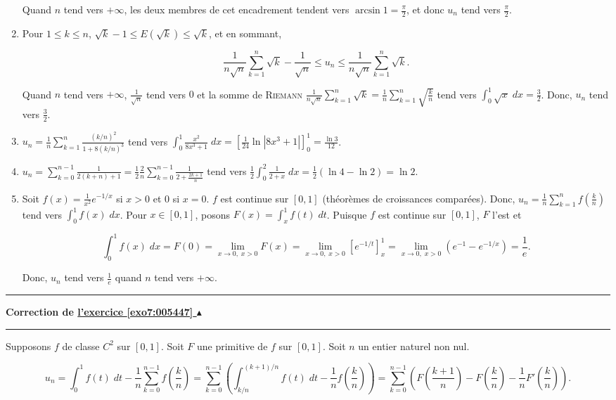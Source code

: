 \documentclass[11pt,a4paper]{article}
\newcommand{\Arcsin}{\mathop{\mathrm{arcsin}}\nolimits}
\newcounter{exo}
\newcommand{\correction}[1]{\hypertarget{cor7:#1}{}\label{cor7:#1}{\bf Correction de \hyperlink{exo7:#1}{l'exercice \ref{exo7:#1} $\blacktriangle$}}\vspace{1mm}\hrule\vspace{1mm}}
\newcommand{\fincorrection}{\vspace{1mm}\hrule\vspace*{7mm}}
\begin{document}
\begin{enumerate}
Quand $n$ tend vers $+\infty$, les deux membres de cet encadrement tendent vers $\Arcsin1=\frac{\pi}{2}$, et donc $u_n$ tend vers $\frac{\pi}{2}$.

\item  Pour $1\leq k\leq n$, $\sqrt{k}-1\leq E(\sqrt{k})\leq \sqrt{k}$, et en sommant,

$$\frac{1}{n\sqrt{n}}\sum_{k=1}^{n}\sqrt{k}-\frac{1}{\sqrt{n}}\leq u_n\leq \frac{1}{n\sqrt{n}}\sum_{k=1}^{n}\sqrt{k}.$$

Quand $n$ tend vers $+\infty$, $\frac{1}{\sqrt{n}}$ tend vers $0$ et la somme de \textsc{Riemann} $\frac{1}{n\sqrt{n}}\sum_{k=1}^{n}\sqrt{k}=\frac{1}{n}\sum_{k=1}^{n}\sqrt{\frac{k}{n}}$ tend vers $\int_{0}^{1}\sqrt{x}\;dx=\frac{3}{2}$. Donc, $u_n$ tend vers $\frac{3}{2}$.

\item  $u_n=\frac{1}{n}\sum_{k=1}^{n}\frac{(k/n)^2}{1+8(k/n)^3}$ tend vers $\int_{0}^{1}\frac{x^2}{8x^3+1}\;dx=\left[\frac{1}{24}\ln|8x^3+1|\right]_{0}^{1}=\frac{\ln3}{12}$.

\item  $u_n=\sum_{k=0}^{n-1}\frac{1}{2(k+n)+1}=\frac{1}{2}\frac{2}{n}\sum_{k=0}^{n-1}\frac{1}{2+\frac{2k+1}{n}}$ tend vers $\frac{1}{2}\int_{0}^{2}\frac{1}{2+x}\;dx=\frac{1}{2}(\ln4-\ln2)=\ln2$.

\item  Soit $f(x)=\frac{1}{x^2}e^{-1/x}$ si $x>0$ et $0$ si $x=0$. $f$ est continue sur $[0,1]$ (théorèmes de croissances comparées). Donc, $u_n=\frac{1}{n}\sum_{k=1}^{n}f(\frac{k}{n})$ tend vers $\int_{0}^{1}f(x)\;dx$. Pour $x\in[0,1]$, posons $F(x)=\int_{x}^{1}f(t)\;dt$. Puisque $f$ est continue sur $[0,1]$, $F$ l'est et

$$\int_{0}^{1}f(x)\;dx=F(0)=\lim_{x\rightarrow 0,\;x>0}F(x)=\lim_{x\rightarrow 0,\;x>0}\left[e^{-1/t}\right]_{x}^{1}=\lim_{x\rightarrow 0,\;x>0}(e^{-1}-e^{-1/x})=\frac{1}{e}.$$

Donc, $u_n$ tend vers $\frac{1}{e}$ quand $n$ tend vers $+\infty$.

\end{enumerate}
\fincorrection
\correction{005447}
Supposons $f$ de classe $C^2$ sur $[0,1]$.
Soit $F$ une primitive de $f$ sur $[0,1]$. Soit $n$ un entier naturel non nul.

$$u_n=\int_{0}^{1}f(t)\;dt-\frac{1}{n}\sum_{k=0}^{n-1}f(\frac{k}{n})=\sum_{k=0}^{n-1}(\int_{k/n}^{(k+1)/n}f(t)\;dt-\frac{1}{n}f(\frac{k}{n}))=\sum_{k=0}^{n-1}(F(\frac{k+1}{n})-F(\frac{k}{n})-\frac{1}{n}F'(\frac{k}{n})).$$
\end{document}
